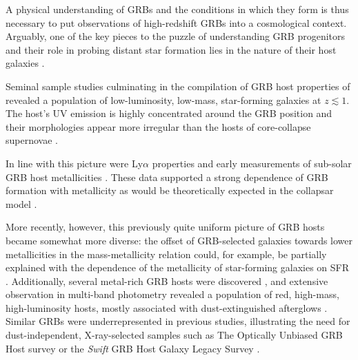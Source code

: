 \documentclass[traditabstract, longauth]{aa}
\begin{document}
A physical understanding of GRBs and the conditions in which they form is thus necessary to put observations of high-redshift GRBs into a cosmological context. Arguably, one of the key pieces to the puzzle of understanding GRB progenitors and their role in probing distant star formation lies in the nature of their host galaxies \citep[e.g.,][for a review]{2014PASP..126....1L}. 

Seminal sample studies \citep[e.g.,][]{2003A&A...400..499L, 2004A&A...425..913C, 2004MNRAS.352.1073T, 2010AJ....139..694L} culminating in the compilation of GRB host properties of \citet{2009ApJ...691..182S} revealed a population of low-luminosity, low-mass, star-forming galaxies at $z\lesssim1$. The host's UV emission is highly concentrated around the GRB position and their morphologies appear more irregular than the hosts of core-collapse supernovae \citep{2006Natur.441..463F, 2010MNRAS.405...57S}. 

In line with this picture were Ly$\alpha$ properties \citep{2003A&A...406L..63F, 2012ApJ...756...25M} and early measurements of sub-solar GRB host metallicities \citep[e.g.,][]{2004ApJ...611..200P, 2005A&A...444..711G, 2005NewA...11..103S}. These data supported a strong dependence of GRB formation with metallicity \citep[e.g.,][]{2005A&A...443..581H, 2006A&A...460..199Y} as would be theoretically expected in the collapsar model \citep{1993ApJ...405..273W, 1999ApJ...524..262M}. 

More recently, however, this previously quite uniform picture of GRB hosts became somewhat more diverse: the offset of GRB-selected galaxies towards lower metallicities in the mass-metallicity relation \citep{2010AJ....140.1557L} could, for example, be partially explained with the dependence of the metallicity of star-forming galaxies on SFR \citep[e.g.,][]{2011MNRAS.414.1263M, 2011ApJ...735L...8K}. Additionally, several metal-rich GRB hosts were discovered \citep{2010ApJ...712L..26L, 2013A&A...556A..23E, 2015Patsubm}, and extensive observation in multi-band photometry revealed a population of red, high-mass, high-luminosity hosts, mostly associated with dust-extinguished afterglows \citep{2011A&A...534A.108K, 2012A&A...545A..77R, 2012ApJ...756..187H, 2013ApJ...778..128P}. Similar GRBs were underrepresented in previous studies, illustrating the need for dust-independent, X-ray-selected samples such as The Optically Unbiased GRB Host survey \citep[TOUGH,][]{2012ApJ...756..187H} or the \textit{Swift} GRB Host Galaxy Legacy Survey \citep[SHOALS,][]{2015arXiv150402482P}.
\end{document}
